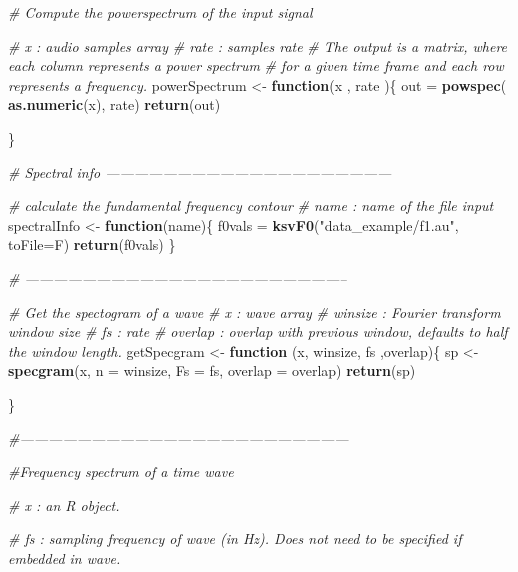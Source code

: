\documentclass[]{article}
\newenvironment{Shaded}{\begin{snugshade}}{\end{snugshade}}
\newcommand{\KeywordTok}[1]{\textcolor[rgb]{0.13,0.29,0.53}{\textbf{#1}}}
\newcommand{\DataTypeTok}[1]{\textcolor[rgb]{0.13,0.29,0.53}{#1}}
\newcommand{\StringTok}[1]{\textcolor[rgb]{0.31,0.60,0.02}{#1}}
\newcommand{\CommentTok}[1]{\textcolor[rgb]{0.56,0.35,0.01}{\textit{#1}}}
\newcommand{\ControlFlowTok}[1]{\textcolor[rgb]{0.13,0.29,0.53}{\textbf{#1}}}
\newcommand{\NormalTok}[1]{#1}
\begin{document}
\begin{Shaded}
\begin{Highlighting}[]
\CommentTok{# Compute the powerspectrum of the input signal}

\CommentTok{# x : audio samples array }
\CommentTok{# rate : samples rate }
\CommentTok{# The output is a matrix, where each column represents a power spectrum }
\CommentTok{# for a given time frame and each row represents a frequency.}
\NormalTok{powerSpectrum <-}\StringTok{ }\ControlFlowTok{function}\NormalTok{(x , rate )\{}
\NormalTok{  out =}\StringTok{ }\KeywordTok{powspec}\NormalTok{( }\KeywordTok{as.numeric}\NormalTok{(x), rate)}
  \KeywordTok{return}\NormalTok{(out)}

\NormalTok{\}}


\CommentTok{# Spectral info ------------------------------------------------------------}

\CommentTok{# calculate the fundamental frequency contour}
\CommentTok{# name : name of the file input}
\NormalTok{spectralInfo <-}\StringTok{ }\ControlFlowTok{function}\NormalTok{(name)\{}
\NormalTok{   f0vals =}\StringTok{ }\KeywordTok{ksvF0}\NormalTok{(}\StringTok{"data_example/f1.au"}\NormalTok{, }\DataTypeTok{toFile=}\NormalTok{F)}
   \KeywordTok{return}\NormalTok{(f0vals)}
\NormalTok{\}}



\CommentTok{# --------------------------------------------------------------------}

\CommentTok{# Get the spectogram of a wave }
\CommentTok{# x : wave array }
\CommentTok{# winsize : Fourier transform window size}
\CommentTok{# fs : rate }
\CommentTok{# overlap : overlap with previous window, defaults to half the window length.}
\NormalTok{getSpecgram <-}\StringTok{ }\ControlFlowTok{function}\NormalTok{ (x, winsize, fs ,overlap)\{}
\NormalTok{  sp  <-}\StringTok{ }\KeywordTok{specgram}\NormalTok{(x, }\DataTypeTok{n =}\NormalTok{ winsize, }\DataTypeTok{Fs =}\NormalTok{ fs,  }\DataTypeTok{overlap =}\NormalTok{ overlap)}
  \KeywordTok{return}\NormalTok{(sp)}
  
\NormalTok{\}}

\CommentTok{#---------------------------------------------------------------------}

\CommentTok{#Frequency spectrum of a time wave}

\CommentTok{# x : an R object.}

\CommentTok{# fs :  sampling frequency of wave (in Hz). Does not need to be specified if embedded in wave.}


\end{Highlighting}
\end{Shaded}
\end{document}
